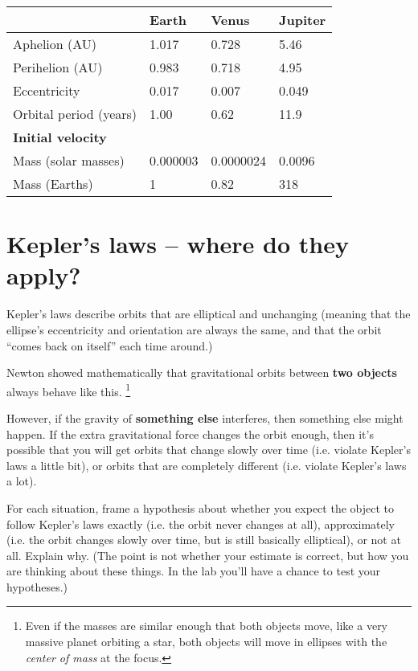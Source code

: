 \documentclass[11pt]{article}
\begin{document}
\begin{center}

\bigskip

\Large
\begin{tabular}{|l|l|l|l|}
	\hline
	& Earth    & Venus     & Jupiter \\ \hline
	Aphelion (AU)             & 1.017    & 0.728     & 5.46    \\ \hline
	Perihelion (AU)           & 0.983    & 0.718     & 4.95    \\ \hline
	Eccentricity              & 0.017    & 0.007     & 0.049   \\ \hline
	Orbital period (years)    & 1.00     & 0.62      & 11.9    \\ \hline
	\textbf{Initial velocity} &          &           &         \\ \hline
	Mass (solar masses)       & 0.000003 & 0.0000024 & 0.0096  \\ \hline
	Mass (Earths)             & 1        & 0.82      & 318     \\ \hline
\end{tabular}

\end{center}

\newpage

\section{Kepler's laws -- where do they apply?}

Kepler's laws describe orbits that are elliptical and unchanging (meaning that the ellipse's eccentricity and orientation are always the same, and that the orbit ``comes back on itself'' each time around.)

Newton showed mathematically that gravitational orbits between {\bf two objects} always behave like this. \footnote{Even if the masses are similar enough that both objects move, like a very massive planet orbiting a star, both objects will move in ellipses with the {\it center of mass} at the focus.}

However, if the gravity of {\bf something else} interferes, then something else might happen. If the extra gravitational force changes the orbit enough, then it's possible that you will get orbits that change slowly over time (i.e. violate Kepler's laws a little bit), or orbits that are completely different (i.e. violate Kepler's laws a lot).

For each situation, frame a hypothesis about whether you expect the object to follow Kepler's laws exactly (i.e. the orbit never changes at all), approximately (i.e. the orbit changes slowly over time, but is still basically elliptical), or not at all. Explain why. (The point is not whether your estimate is correct, but how you are thinking about these things. In the lab you'll have a chance to test your hypotheses.)
\end{document}
